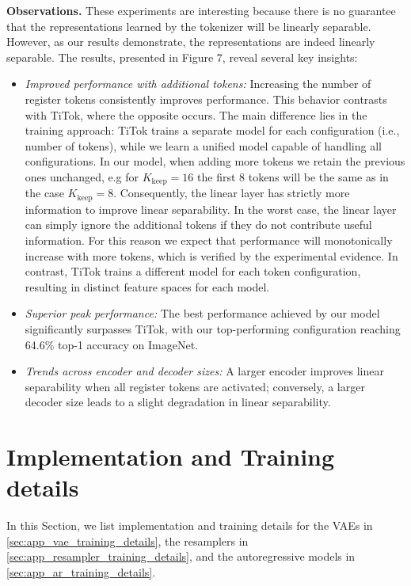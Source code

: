 \textbf{Observations.} 
These experiments are interesting because there is no  guarantee that the representations learned by the tokenizer will be linearly separable. However, as our results demonstrate, the representations are indeed linearly separable. The results, presented in Figure 7, reveal several key insights:
\begin{itemize}
    \item \textit{Improved performance with additional tokens:} Increasing the number of register tokens consistently improves performance. This behavior contrasts with TiTok, where the opposite occurs. The main difference lies in the training approach: TiTok trains a separate model for each configuration (i.e., number of tokens), while we learn a unified model capable of handling all configurations. In our model, when adding more tokens we retain the previous ones unchanged, e.g for $K_\text{keep} = 16$ the first 8 tokens will be the same as in the case $K_\text{keep} = 8$. Consequently, the linear layer has strictly more information to improve linear separability. In the worst case, the linear layer can simply ignore the additional tokens if they do not contribute useful information. For this reason we expect that performance will monotonically increase with more tokens, which is verified by the experimental evidence. In contrast, TiTok trains a different model for each token configuration, resulting in distinct feature spaces for each model.
    \item \textit{Superior peak performance:} The best performance achieved by our model significantly surpasses TiTok, with our top-performing configuration reaching 64.6\% top-1 accuracy on ImageNet.
    \item \textit{Trends across encoder and decoder sizes:} A larger encoder improves linear separability when all register tokens are activated; conversely, a larger decoder size leads to a slight degradation in linear separability.
\end{itemize}


\clearpage
\section{Implementation and Training details}
\label{sec:app_training_details}

In this Section, we list implementation and training details for the VAEs in \cref{sec:app_vae_training_details}, the resamplers in \cref{sec:app_resampler_training_details}, and the autoregressive models in \cref{sec:app_ar_training_details}.

